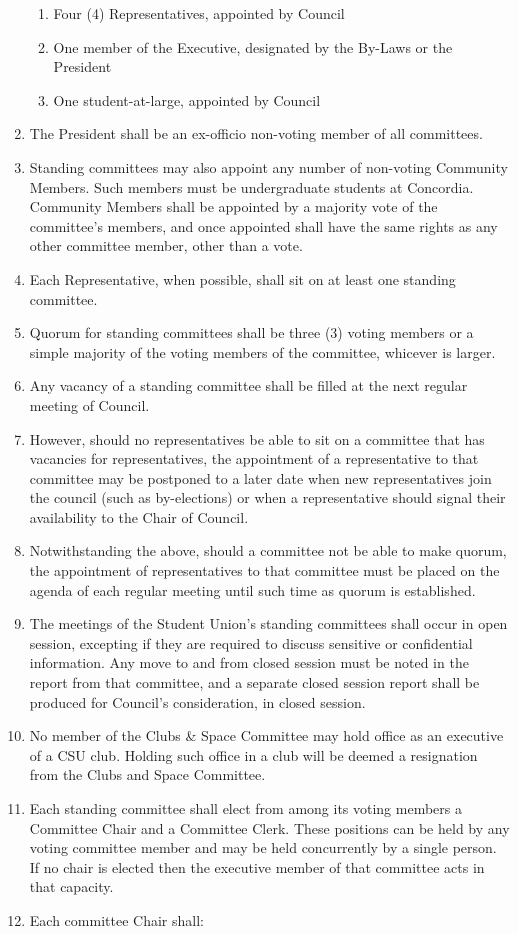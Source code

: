 \documentclass[oneside]{book}
\begin{document}
\begin{enumerate}
\begin{enumerate}
\item Four (4) Representatives, appointed by Council 
\item One member of the Executive, designated by the By-Laws or the President 
\item One student-at-large, appointed by Council 
\end{enumerate}
\item The President shall be an ex-officio non-voting member of all committees. 
\item Standing committees may also appoint any number of non-voting Community Members. 
Such members must be undergraduate students at Concordia. Community Members shall be 
appointed by a majority vote of the committee’s members, and once appointed shall have 
the same rights as any other committee member, other than a vote.
\item Each Representative, when possible, shall sit on at least one standing
committee. 
\item Quorum for standing committees shall be three (3) voting members or a simple majority 
of the voting members of the committee, whicever is larger. 
\item \label{committee-vacancy} Any vacancy of a standing committee shall be filled at the next regular
meeting of Council. 
\item However, should no representatives be able to sit on a committee that has vacancies for 
representatives, the appointment of a representative to that committee may be postponed to a 
later date when new representatives join the council (such as by-elections) or when a representative 
should signal their availability to the Chair of Council.
\item Notwithstanding the above, should a committee not be able to make quorum, the appointment of 
representatives to that committee must be placed on the agenda of each regular meeting until such 
time as quorum is established.
\item The meetings of the Student Union’s standing committees shall occur in open session, excepting 
if they are required to discuss sensitive or confidential information. Any move to and from closed 
session must be noted in the report from that committee, and a separate closed session report shall 
be produced for Council’s consideration, in closed session.
\item No member of the Clubs \& Space Committee may hold office as an executive 
of a CSU club. Holding such office in a club will be deemed a resignation from the 
Clubs and Space Committee. 
\item Each standing committee shall elect from among its voting members a Committee Chair 
and a Committee Clerk. These positions can be held by any voting committee 
member and may be held concurrently by a single person. If no chair is elected then the executive 
member of that committee acts in that capacity. 
\item \label{committee-chair-responsibilities} Each committee Chair shall: 


\end{enumerate}
\end{document}

